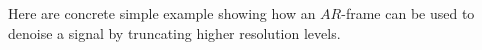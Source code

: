 \documentclass[12pt,titlepage]{amsart}
\theoremstyle{definition}
\theoremstyle{remark}
\begin{document}


Here are concrete simple example showing how an $AR$-frame can be
used to denoise a signal by truncating higher resolution levels.
\end{document}

